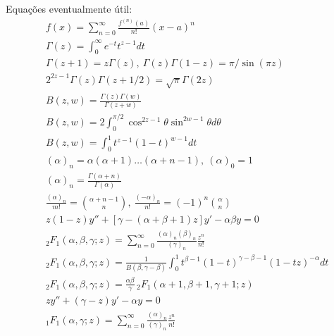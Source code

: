 \documentclass[a4paper,12pt, leqno, answers]{exam}
\begin{document}
\thispagestyle{empty}

\newpage
\setcounter{page}{1}
Equa\c{c}\~{o}es eventualmente útil:
\begin{align}
    & f(x) = \sum_{n = 0}^\infty \frac{f^{(n)}(a)}{n!} (x - a)^n \tag{ST} \label{eq:ser_taylor} \\
    & \Gamma(z) = \int_0^\infty e^{-t} t^{z - 1} dt \tag{GE} \label{eq:gamma_euler} \\
    & \Gamma(z + 1) = z \Gamma(z), \ \Gamma(z) \Gamma(1 - z) = \pi / \sin(\pi z) \label{eq:gamma_rel} \\
    & 2^{2 z - 1} \Gamma(z) \Gamma(z + 1/2) = \sqrt{\pi} \Gamma(2 z) \label{eq:gamma_dup_legendre} \\
    & B(z, w) = \frac{\Gamma(z) \Gamma(w)}{\Gamma(z + w)} \tag{BG} \label{eq:beta} \\
    & B(z, w) = 2 \int_0^{\pi / 2} \cos^{2z - 1} \theta \sin^{2w - 1} \theta d\theta \tag{BT} \label{eq:beta_trig} \\
    & B(z, w) = \int_0^1 t^{z - 1} (1 - t)^{w - 1} dt \tag{BI} \label{eq:beta_int} \\
    & (\alpha)_n = \alpha (\alpha + 1) \ldots (\alpha + n - 1), \ (\alpha)_0 = 1 \tag{SP} \label{eq:sim_poch} \\
    & (\alpha)_n = \frac{\Gamma(\alpha + n)}{\Gamma(\alpha)} \label{eq:sim_poch_gamma} \\
    & \frac{(\alpha)_n}{m!} = \binom{\alpha + n - 1}{n}, \ \frac{(-\alpha)_n}{n!} = (-1)^n \binom{\alpha}{n} \label{eq:sim_poch_binom} \\
    & z(1 - z)y'' + \left[ \gamma - (\alpha + \beta + 1) z \right] y' - \alpha \beta y = 0 \tag{EH} \label{eq:hiperg} \\
    & {}_2F_1(\alpha, \beta, \gamma; z) = \sum_{n = 0}^\infty \frac{(\alpha)_n (\beta)_n}{(\gamma)_n} \frac{z^n}{n!} \tag{SH} \label{eq:ser_hiperg} \\
    & {}_2F_1(\alpha, \beta, \gamma; z) = \frac{1}{B(\beta, \gamma - \beta)} \int_0^1 t^{\beta - 1} (1- t)^{\gamma - \beta - 1} (1 - tz)^{-\alpha} dt \label{eq:hiperg_int} \\
    & {}_2F_1(\alpha, \beta, \gamma; z) = \frac{\alpha \beta}{\gamma} \,{}_2F_1(\alpha + 1, \beta + 1, \gamma + 1; z) \label{eq:hiperg_der} \\
    & zy'' + (\gamma - z)y' - \alpha y = 0 \tag{EHC} \label{eq:hiper_con} \\
    & {}_1F_1(\alpha, \gamma; z) = \sum_{n = 0}^\infty \frac{(\alpha)_n}{(\gamma)_n} \frac{z^n}{n!} \tag{SHC} \label{eq:ser_hiperg_con}
\end{align}
\end{document}
